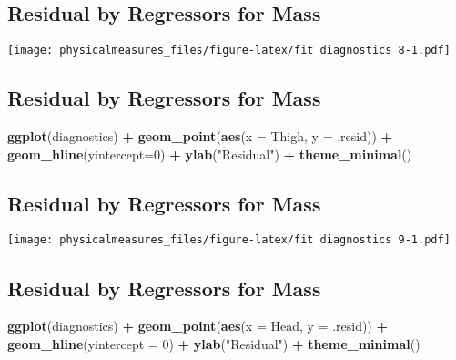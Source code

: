 \documentclass[]{article}
\newenvironment{Shaded}{\begin{snugshade}}{\end{snugshade}}
\newcommand{\KeywordTok}[1]{\textcolor[rgb]{0.13,0.29,0.53}{\textbf{#1}}}
\newcommand{\DataTypeTok}[1]{\textcolor[rgb]{0.13,0.29,0.53}{#1}}
\newcommand{\DecValTok}[1]{\textcolor[rgb]{0.00,0.00,0.81}{#1}}
\newcommand{\StringTok}[1]{\textcolor[rgb]{0.31,0.60,0.02}{#1}}
\newcommand{\OperatorTok}[1]{\textcolor[rgb]{0.81,0.36,0.00}{\textbf{#1}}}
\newcommand{\NormalTok}[1]{#1}
\begin{document}
\subsection{Residual by Regressors for
Mass}\label{residual-by-regressors-for-mass-15}

\texttt{[image: physicalmeasures\_files/figure-latex/fit diagnostics 8-1.pdf]}

\subsection{Residual by Regressors for
Mass}\label{residual-by-regressors-for-mass-16}

\begin{Shaded}
\begin{Highlighting}[]
\KeywordTok{ggplot}\NormalTok{(diagnostics) }\OperatorTok{+}
\StringTok{  }\KeywordTok{geom_point}\NormalTok{(}\KeywordTok{aes}\NormalTok{(}\DataTypeTok{x =}\NormalTok{ Thigh, }\DataTypeTok{y =}\NormalTok{ .resid)) }\OperatorTok{+}
\StringTok{  }\KeywordTok{geom_hline}\NormalTok{(}\DataTypeTok{yintercept=}\DecValTok{0}\NormalTok{) }\OperatorTok{+}
\StringTok{  }\KeywordTok{ylab}\NormalTok{(}\StringTok{"Residual"}\NormalTok{) }\OperatorTok{+}
\StringTok{  }\KeywordTok{theme_minimal}\NormalTok{()}
\end{Highlighting}
\end{Shaded}

\subsection{Residual by Regressors for
Mass}\label{residual-by-regressors-for-mass-17}

\texttt{[image: physicalmeasures\_files/figure-latex/fit diagnostics 9-1.pdf]}

\subsection{Residual by Regressors for
Mass}\label{residual-by-regressors-for-mass-18}

\begin{Shaded}
\begin{Highlighting}[]
\KeywordTok{ggplot}\NormalTok{(diagnostics) }\OperatorTok{+}
\StringTok{  }\KeywordTok{geom_point}\NormalTok{(}\KeywordTok{aes}\NormalTok{(}\DataTypeTok{x =}\NormalTok{ Head, }\DataTypeTok{y =}\NormalTok{ .resid)) }\OperatorTok{+}
\StringTok{  }\KeywordTok{geom_hline}\NormalTok{(}\DataTypeTok{yintercept =} \DecValTok{0}\NormalTok{) }\OperatorTok{+}
\StringTok{  }\KeywordTok{ylab}\NormalTok{(}\StringTok{"Residual"}\NormalTok{) }\OperatorTok{+}
\StringTok{  }\KeywordTok{theme_minimal}\NormalTok{()}
\end{Highlighting}
\end{Shaded}
\end{document}
